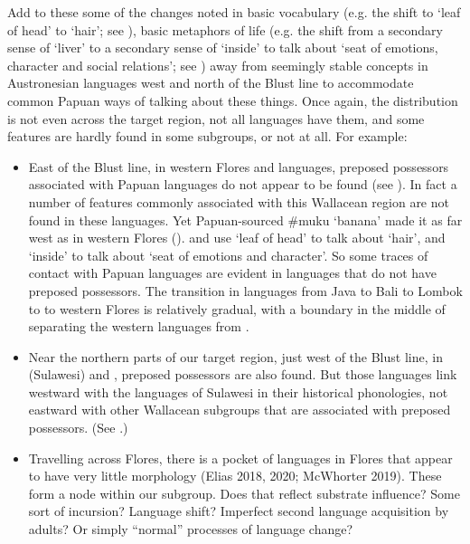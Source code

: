 Add to these some of the changes noted in basic vocabulary (e.g.
the shift to ‘leaf of head’ to ‘hair’; see ),
basic metaphors of life (e.g.
the shift from a secondary sense of ‘liver’ to a secondary sense
of ‘inside’ to talk about ‘seat of emotions,
character and social relations’; see ) away
from seemingly stable concepts in Austronesian languages west
and north of the Blust line to accommodate common Papuan ways
of talking about these things.
Once again, the distribution is not even across the target region,
not all languages have them,
and some features are hardly found in some subgroups,
or not at all.
For example: 

\begin{itemize}
\item	East of the Blust line,
in western Flores and  languages, preposed possessors
associated with Papuan languages do not appear to be found (see ).
In fact a number of features commonly associated with this Wallacean
region are not found in these languages.
Yet Papuan-sourced {\#}muku ‘banana’ made it as far west as 
in western Flores ().
 and  use ‘leaf of head’ to talk about ‘hair’,
and ‘inside’ to talk about ‘seat of emotions and character’.
So some traces of contact with Papuan languages are evident in
languages that do not have preposed possessors.
The transition in languages from Java to Bali to Lombok to 
to western Flores is relatively gradual,
with a boundary in the middle of  separating the western languages from .

\item	Near the northern parts of our target region,
just west of the Blust line,
in  (Sulawesi) and , preposed possessors are also found.
But those languages link westward with the  languages
of Sulawesi in their historical phonologies,
not eastward with other Wallacean subgroups that are associated with preposed possessors.
(See .) 
\item	Travelling across Flores,
there is a pocket of languages in  Flores that appear
to have very little morphology (Elias 2018, 2020; McWhorter 2019).
These form a node within our  subgroup.
Does that reflect substrate influence? Some sort of incursion?
Language shift? Imperfect second language acquisition by adults?
Or simply ``normal'' processes of language change?


\end{itemize}
